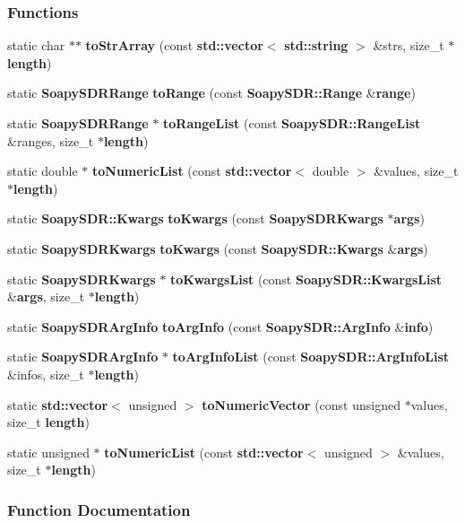 \subsubsection*{Functions}
\begin{DoxyCompactItemize}
\item 
static char $\ast$$\ast$ {\bf to\+Str\+Array} (const {\bf std\+::vector}$<$ {\bf std\+::string} $>$ \&strs, size\+\_\+t $\ast${\bf length})
\item 
static {\bf Soapy\+S\+D\+R\+Range} {\bf to\+Range} (const {\bf Soapy\+S\+D\+R\+::\+Range} \&{\bf range})
\item 
static {\bf Soapy\+S\+D\+R\+Range} $\ast$ {\bf to\+Range\+List} (const {\bf Soapy\+S\+D\+R\+::\+Range\+List} \&ranges, size\+\_\+t $\ast${\bf length})
\item 
static double $\ast$ {\bf to\+Numeric\+List} (const {\bf std\+::vector}$<$ double $>$ \&values, size\+\_\+t $\ast${\bf length})
\item 
static {\bf Soapy\+S\+D\+R\+::\+Kwargs} {\bf to\+Kwargs} (const {\bf Soapy\+S\+D\+R\+Kwargs} $\ast${\bf args})
\item 
static {\bf Soapy\+S\+D\+R\+Kwargs} {\bf to\+Kwargs} (const {\bf Soapy\+S\+D\+R\+::\+Kwargs} \&{\bf args})
\item 
static {\bf Soapy\+S\+D\+R\+Kwargs} $\ast$ {\bf to\+Kwargs\+List} (const {\bf Soapy\+S\+D\+R\+::\+Kwargs\+List} \&{\bf args}, size\+\_\+t $\ast${\bf length})
\item 
static {\bf Soapy\+S\+D\+R\+Arg\+Info} {\bf to\+Arg\+Info} (const {\bf Soapy\+S\+D\+R\+::\+Arg\+Info} \&{\bf info})
\item 
static {\bf Soapy\+S\+D\+R\+Arg\+Info} $\ast$ {\bf to\+Arg\+Info\+List} (const {\bf Soapy\+S\+D\+R\+::\+Arg\+Info\+List} \&infos, size\+\_\+t $\ast${\bf length})
\item 
static {\bf std\+::vector}$<$ unsigned $>$ {\bf to\+Numeric\+Vector} (const unsigned $\ast$values, size\+\_\+t {\bf length})
\item 
static unsigned $\ast$ {\bf to\+Numeric\+List} (const {\bf std\+::vector}$<$ unsigned $>$ \&values, size\+\_\+t $\ast${\bf length})
\end{DoxyCompactItemize}


\subsubsection{Function Documentation}
